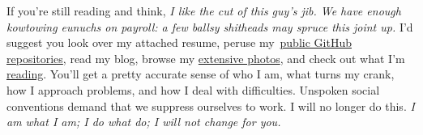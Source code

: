 If you're still reading and think, \emph{I like the cut of this guy's
jib. We have enough kowtowing eunuchs on payroll: a few ballsy shitheads
may spruce this joint up.} I'd suggest you look over my attached resume,
peruse my~\href{https://github.com/bakerjd99}{public GitHub
repositories}, read my blog, browse my
\href{https://conceptcontrol.smugmug.com}{extensive photos}, and check
out what I'm
\href{https://www.goodreads.com/review/list/5664087-john?utf8=\%E2\%9C\%93\&shelf=read\&sort=date_read\&order=d}{reading}.
You'll get a pretty accurate sense of who I am, what turns my crank, how
I approach problems, and how I deal with difficulties. Unspoken social
conventions demand that we suppress ourselves to work. I will no longer
do this. \emph{I am what I am; I do what do; I will not change for you.}

%
%



%